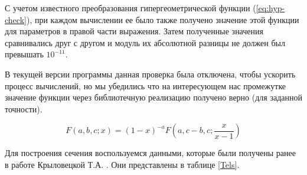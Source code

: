 \documentclass[%
master,    %
natbib,      %
subf,        %
href,        %
colorlinks,  %
]{disser}
\begin{document}
С учетом известного преобразования гипергеометрической функции (\ref{eq:hyp-check}), при каждом вычислении ее было также получено значение этой функции для параметров в правой части выражения. Затем полученные значения сравнивались друг с другом и модуль их абсолютной разницы не должен был превышать $10^{-11}$. 

В текущей версии программы данная проверка была отключена, чтобы ускорить процесс вычислений, но мы убедились что на интересующем нас промежутке значение функции через библиотечную реализацию получено верно (для заданной точности).

\begin{equation}
\label{eq:hyp-check}
F(a,b,c;x) = (1-x)^{-a}F\left(a,c-b,c; \frac{x}{x-1}\right)
\end{equation}

Для построения сечения воспользуемся данными, которые были получены ранее в работе Крыловецкой Т.А. \cite{tak}. Они представлены в таблице \ref{Tels}.
\end{document}
